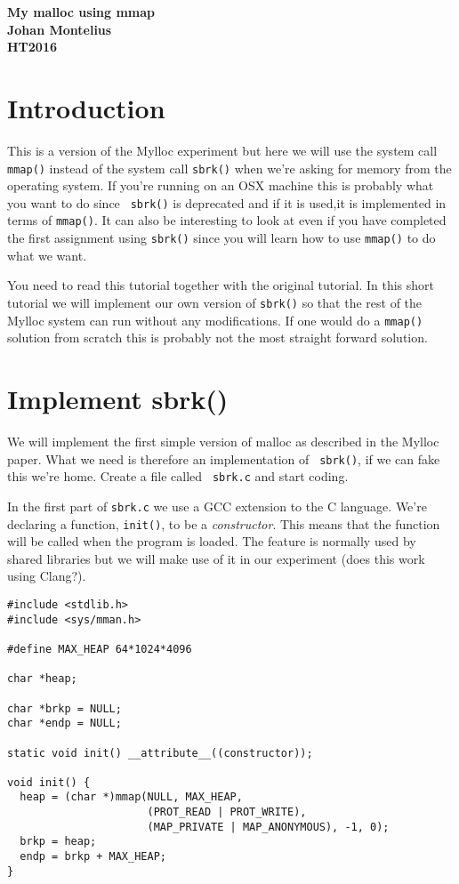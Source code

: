 \documentclass[a4paper,11pt]{article}
\begin{document}
\begin{center} \vspace{20pt} \textbf{\large My malloc using mmap}\\
\vspace{10pt} \textbf{Johan Montelius}\\ \vspace{10pt} \textbf{HT2016}
\end{center}


\section{Introduction}

This is a version of the Mylloc experiment but here we will use the
system call {\tt mmap()} instead of the system call {\tt sbrk()} when
we're asking for memory from the operating system. If you're running
on an OSX machine this is probably what you want to do since {\tt
  sbrk()} is deprecated and if it is used,it is implemented in
terms of {\tt mmap()}. It can also be interesting to look at even if
you have completed the first assignment using {\tt sbrk()} since you will 
learn how to use {\tt mmap()} to do what we want. 

You need to read this tutorial together with the original
tutorial. In this short tutorial we will implement our own version of
{\tt sbrk()} so that the rest of the Mylloc system can run without any
modifications. If one would do a {\tt mmap()} solution from scratch
this is probably not the most straight forward solution.

\section{Implement sbrk()}

We will implement the first simple version of malloc as described in
the Mylloc paper. What we need is therefore an implementation of {\tt
  sbrk()}, if we can fake this we're home. Create a file called {\tt
  sbrk.c} and start coding.

In the first part of {\tt sbrk.c} we use a GCC extension to the C
language. We're declaring a function, {\tt init()}, to be a {\em
  constructor}. This means that the function will be called when the
program is loaded. The feature is normally used by shared libraries
but we will make use of it in our experiment (does this work using
Clang?).


\begin{lstlisting}
#include <stdlib.h>
#include <sys/mman.h>

#define MAX_HEAP 64*1024*4096

char *heap;

char *brkp = NULL;
char *endp = NULL;

static void init() __attribute__((constructor));

void init() {
  heap = (char *)mmap(NULL, MAX_HEAP,  
                      (PROT_READ | PROT_WRITE), 
                      (MAP_PRIVATE | MAP_ANONYMOUS), -1, 0);
  brkp = heap;
  endp = brkp + MAX_HEAP;
}
\end{lstlisting}
\end{document}
